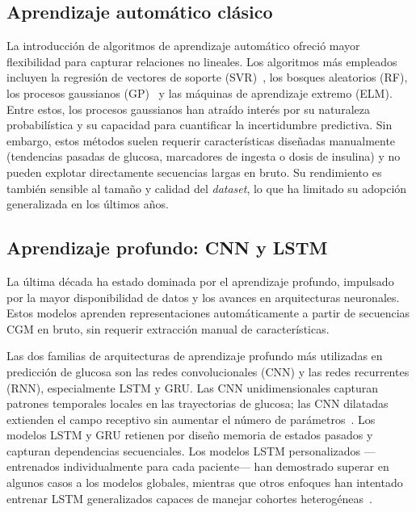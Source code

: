 \subsection{Aprendizaje automático clásico}
\label{subsec:modelos_clasicos_ml}

La introducción de algoritmos de aprendizaje automático ofreció mayor flexibilidad para capturar relaciones no lineales. Los algoritmos más empleados incluyen la regresión de vectores de soporte (SVR)~\cite{pappada2011development}, los bosques aleatorios (RF), los procesos gaussianos (GP)~\cite{fraccaro2016prediction} y las máquinas de aprendizaje extremo (ELM). Entre estos, los procesos gaussianos han atraído interés por su naturaleza probabilística y su capacidad para cuantificar la incertidumbre predictiva. Sin embargo, estos métodos suelen requerir características diseñadas manualmente (tendencias pasadas de glucosa, marcadores de ingesta o dosis de insulina) y no pueden explotar directamente secuencias largas en bruto. Su rendimiento es también sensible al tamaño y calidad del \emph{dataset}, lo que ha limitado su adopción generalizada en los últimos años.

\subsection{Aprendizaje profundo: CNN y LSTM}
\label{subsec:modelos_dl}

La última década ha estado dominada por el aprendizaje profundo, impulsado por la mayor disponibilidad de datos y los avances en arquitecturas neuronales. Estos modelos aprenden representaciones automáticamente a partir de secuencias CGM en bruto, sin requerir extracción manual de características.

Las dos familias de arquitecturas de aprendizaje profundo más utilizadas en predicción de glucosa son las redes convolucionales (CNN) y las redes recurrentes (RNN), especialmente LSTM y GRU. Las CNN unidimensionales capturan patrones temporales locales en las trayectorias de glucosa; las CNN dilatadas extienden el campo receptivo sin aumentar el número de parámetros~\cite{li2019convolutional}. Los modelos LSTM y GRU retienen por diseño memoria de estados pasados y capturan dependencias secuenciales. Los modelos LSTM personalizados —entrenados individualmente para cada paciente— han demostrado superar en algunos casos a los modelos globales, mientras que otros enfoques han intentado entrenar LSTM generalizados capaces de manejar cohortes heterogéneas~\cite{mirshekarian2019using}.

